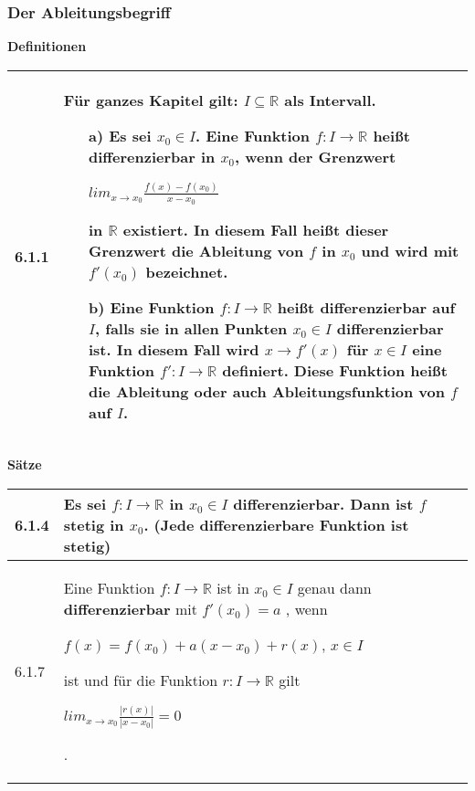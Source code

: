 \subsubsection{Der Ableitungsbegriff}

    \noindent
    \textbf{Definitionen}
    \begin{table}[H]  
    \begin{tabularx}{\textwidth}{X m{16cm}}
        \toprule

        6.1.1 & Für ganzes Kapitel gilt: $I \subseteq \mathbb{R}$ als Intervall.
                \begin{itemize}
                    \item[a)] Es sei $x_0 \in I$. Eine Funktion $f: I \rightarrow \mathbb{R}$ heißt differenzierbar in $x_0$, wenn der Grenzwert 
                                \centerline{$lim_{x \rightarrow x_0} \frac{f(x)-f(x_0)}{x-x_0}$}
                                in $\mathbb{R}$ existiert. In diesem Fall heißt dieser Grenzwert die \textbf{Ableitung} von $f$ in $x_0$ und wird 
                                mit \textbf{$f'(x_0)$} bezeichnet.
                    \item[b)] Eine Funktion $f: I \rightarrow \mathbb{R}$ heißt \textbf{differenzierbar} auf $I$, falls sie in allen Punkten
                                $x_0 \in I$ differenzierbar ist. In diesem Fall wird $x \rightarrow f'(x)$  für $x \in I$ eine Funktion 
                                $f': I \rightarrow \mathbb{R}$ definiert. Diese Funktion heißt die \textbf{Ableitung} oder auch 
                                \textbf{Ableitungsfunktion} von $f$ auf $I$.
                \end{itemize} \\

        \bottomrule

    \end{tabularx}
    \end{table}

    \noindent 
    \textbf{Sätze}
    \begin{table}[H]
    \begin{tabularx}{\textwidth}{X m{16cm}}
        \toprule

        6.1.4 & Es sei $f: I \rightarrow \mathbb{R}$ in $x_0 \in I$ differenzierbar. Dann ist $f$ \textbf{stetig} in $x_0$. \hfill \break
                (Jede differenzierbare Funktion ist stetig) \\
        \midrule
        6.1.7 & Eine Funktion $f: I \rightarrow \mathbb{R}$ ist in $x_0 \in I$ genau dann \textbf{differenzierbar} mit $f'(x_0)=a$
                , wenn \hfill \break
                \centerline{$f(x) = f(x_0) + a(x-x_0)+r(x)$, $x \in I$}
                ist und für die Funktion $r: I \rightarrow \mathbb{R}$ gilt \hfill \break
                \centerline{$lim_{x \rightarrow x_0}\frac{|r(x)|}{|x-x_0|} = 0$}. \\

        \bottomrule
    \end{tabularx}
    \end{table}

